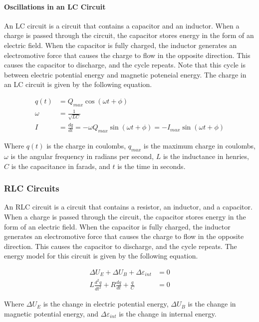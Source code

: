 \paragraph*{Oscillations in an LC Circuit}
An LC circuit is a circuit that contains a capacitor and an inductor. When a charge is passed through the circuit, the capacitor stores energy in the form of 
an electric field. When the capacitor is fully charged, the inductor generates an electromotive force that causes the charge to flow in the opposite direction.
This causes the capacitor to discharge, and the cycle repeats. Note that this cycle is between electric potential energy and magnetic poteneial
energy. The charge in an LC circuit is given by the following equation.

\begin{align*}
    q(t) &= Q_{max}\cos(\omega t + \phi)\\
    \omega &= \frac{1}{\sqrt{LC}}\\
    I &= \frac{dq}{dt} = -\omega Q_{max}\sin(\omega t + \phi) = -I_{max}\sin(\omega t + \phi)
\end{align*}

Where $q(t)$ is the charge in coulombs, $q_{max}$ is the maximum charge in coulombs, $\omega$ is the angular frequency in radians per second, $L$ is the 
inductance in henries, $C$ is the capacitance in farads, and $t$ is the time in seconds.\\

\subsubsection*{RLC Circuits}
An RLC circuit is a circuit that contains a resistor, an inductor, and a capacitor. When a charge is passed through the circuit, the capacitor stores energy 
in the form of an electric field. When the capacitor is fully charged, the inductor generates an electromotive force that causes the charge to flow in the 
opposite direction. This causes the capacitor to discharge, and the cycle repeats. The energy model for this circuit is given by the following equation.

\begin{align*}
    \Delta U_E + \Delta U_B + \Delta \varepsilon_{int} &= 0\\
    L\frac{d^2q}{dt^2} + R\frac{dq}{dt} + \frac{q}{C} &= 0
\end{align*}

Where $\Delta U_E$ is the change in electric potential energy, $\Delta U_B$ is the change in magnetic potential energy, and $\Delta \varepsilon_{int}$ is the change in internal energy.\\

